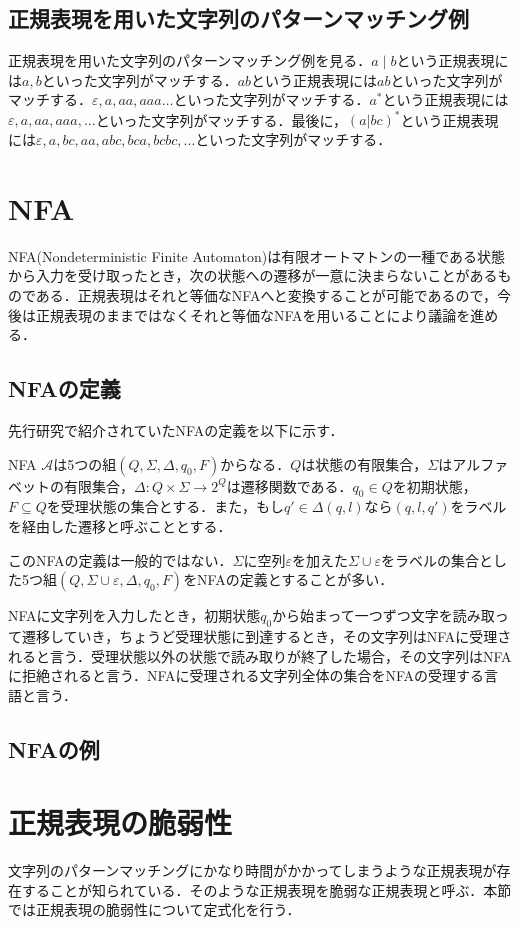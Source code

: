 \documentclass[a4paper, 12pt, dvipdfmx, uplatex]{jsreport}
\begin{document}
\subsection{正規表現を用いた文字列のパターンマッチング例}
正規表現を用いた文字列のパターンマッチング例を見る．$a\mid b$という正規表現には$a,b$といった文字列がマッチする．$ab$という正規表現には$ab$といった文字列がマッチする．$\varepsilon,a,aa,aaa\ldots$といった文字列がマッチする．$a^*$という正規表現には$\varepsilon,a,aa,aaa,\ldots$といった文字列がマッチする．最後に，$(a|bc)^*$という正規表現には$\varepsilon,a,bc,aa,abc,bca,bcbc,\ldots$といった文字列がマッチする．


\section{NFA}
NFA(Nondeterministic Finite Automaton)は有限オートマトンの一種である状態から入力を受け取ったとき，次の状態への遷移が一意に決まらないことがあるものである．正規表現はそれと等価なNFAへと変換することが可能であるので，今後は正規表現のままではなくそれと等価なNFAを用いることにより議論を進める．

\subsection{NFAの定義}
先行研究で紹介されていたNFAの定義を以下に示す．
\begin{dfn}[NFA]
  NFA $\mathcal{A}$は5つの組$(Q,\Sigma,\Delta,q_0,F)$からなる．$Q$は状態の有限集合，$\Sigma$はアルファベットの有限集合，$\Delta :Q\times \Sigma \rightarrow 2^Q$は遷移関数である．$q_0 \in Q$を初期状態，$F \subseteq Q$を受理状態の集合とする．また，もし$q'\in \Delta (q,l)$なら$(q,l,q')$をラベルを経由した遷移と呼ぶこととする．
\end{dfn}

このNFAの定義は一般的ではない．$\Sigma$に空列$\varepsilon$を加えた$\Sigma \cup {\varepsilon}$をラベルの集合とした5つ組$(Q,\Sigma \cup {\varepsilon},\Delta,q_0,F)$をNFAの定義とすることが多い．

NFAに文字列を入力したとき，初期状態$q_0$から始まって一つずつ文字を読み取って遷移していき，ちょうど受理状態に到達するとき，その文字列はNFAに受理されると言う．受理状態以外の状態で読み取りが終了した場合，その文字列はNFAに拒絶されると言う．NFAに受理される文字列全体の集合をNFAの受理する言語と言う．

\subsection{NFAの例}




\section{正規表現の脆弱性}
文字列のパターンマッチングにかなり時間がかかってしまうような正規表現が存在することが知られている．そのような正規表現を脆弱な正規表現と呼ぶ．本節では正規表現の脆弱性について定式化を行う．
\end{document}
